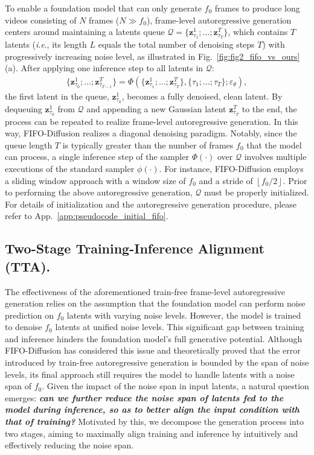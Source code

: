 \documentclass{article}
\theoremstyle{plain}
\theoremstyle{definition}
\theoremstyle{remark}
\newcommand{\ie}{\textit{i}.\textit{e}.}
\begin{document}
To enable a foundation model that can only generate $f_0$ frames to produce long videos consisting of $N$ frames ($N \gg f_0$), frame-level autoregressive generation centers around maintaining a latents queue $\mathcal{Q} = \{\mathbf{z}_{\tau_1}^1;\ldots; \mathbf{z}_{\tau_T}^T\}$, which contains $T$ latents (\ie, its length $L$ equals the total number of denoising steps $T$) with progressively increasing noise level, as illustrated in Fig.~\ref{fig:fig2_fifo_vs_ours} (a). 
After applying one inference step to all latents in $\mathcal{Q}$:
\begin{align}
  \{\mathbf{z}_{\tau_0}^1;\ldots; \mathbf{z}_{\tau_{T-1}}^T\} = \Phi(\{\mathbf{z}_{\tau_1}^1;\ldots; \mathbf{z}_{\tau_T}^T\}, \{\tau_1;\ldots;\tau_T\}; \varepsilon_\theta),
  \label{eq:fifo_infer}
\end{align}
the first latent in the queue, $\mathbf{z}^1_{\tau_0}$, becomes a fully denoised, clean latent. By dequeuing $\mathbf{z}^1_{\tau_0}$ from $\mathcal{Q}$ and appending a new Gaussian latent $\mathbf{z}^T_{\tau_T}$ to the end, the process can be repeated to realize frame-level autoregressive generation. 
In this way, FIFO-Diffusion realizes a diagonal denoising paradigm.
Notably, since the queue length $T$ is typically greater than the number of frames $f_0$ that the model can process, a single inference step of the sampler $\Phi(\cdot)$ over $\mathcal{Q}$ involves multiple executions of the standard sampler $\phi(\cdot)$.
For instance, FIFO-Diffusion employs a sliding window approach with a window size of $f_0$ and a stride of $\left\lfloor f_0 / 2 \right\rfloor$.
Prior to performing the above autoregressive generation, $\mathcal{Q}$ must be properly initialized.
For details of initialization and the autoregressive generation procedure, please refer to App.~\ref{app:pseudocode_initial_fifo}.



\subsection{Two-Stage Training-Inference Alignment (TTA).}
\label{sec_3_2}

The effectiveness of the aforementioned train-free frame-level autoregressive generation relies on the assumption that the foundation model can perform noise prediction on $f_0$ latents with varying noise levels. However, the model is trained to denoise $f_0$ latents at unified noise levels. 
This significant gap between training and inference hinders the foundation model's full generative potential.
Although FIFO-Diffusion \cite{kim2024fifo} has considered this issue and theoretically proved that the error introduced by train-free autoregressive generation is bounded by the span of noise levels, its final approach still requires the model to handle latents with a noise span of $f_0$.
Given the impact of the noise span in input latents, a natural question emerges: \textit{\textbf{can we further reduce the noise span of latents fed to the model during inference, so as to better align the input condition with that of training?}}
Motivated by this, we decompose the generation process into two stages, aiming to maximally align training and inference by intuitively and effectively reducing the noise span.
\end{document}
